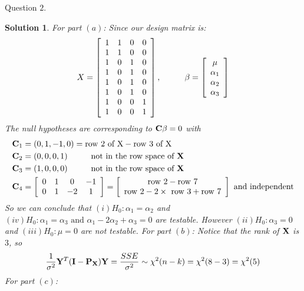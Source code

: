 \documentclass[11pt]{article}
\newtheorem{sol}{Solution}
\begin{document}
Question $2$.
\begin{sol}
	For part $(a)$:\vskip 2mm
	Since our design matrix is:
	\begin{align*}
			X = \left[\begin{array}{cccc}1&1&0&0\\ 1&1&0&0\\ 1&0&1&0\\ 1&0&1&0\\ 1&0&1&0\\ 1&0&1&0\\ 1&0&0&1\\1&0&0&1 \end{array}\right], \hskip 1cm \beta = \left[\begin{array}{c} \mu\\ \alpha_1 \\ \alpha_2\\ \alpha_3\end{array}\right]
	\end{align*}
	The null hypotheses are corresponding to ${\bf C}\beta = 0$ with
	\begin{align*}
		{\bf C}_1 &= (0, 1, -1, 0) = \text{row 2 of X} - \text{row 3 of X}\\
		{\bf C}_2 &= (0, 0, 0, 1) \hskip 1cm \text{not in the row space of }{\bf X}\\
		{\bf C}_3 &= (1, 0, 0, 0) \hskip 1cm \text{not in the row space of }{\bf X}\\
		{\bf C}_4 &= \left[\begin{array}{cccc} 0&1&0&-1\\ 0&1&-2&1\end{array}\right] = \left[\begin{array}{c}\text{row 2} - \text{row 7} \\ \text{row 2} - 2\times\text{ row 3} + \text{row 7}\end{array}\right] \text{ and independent}
	\end{align*}
	So we can conclude that $(i) H_0: \alpha_1 = \alpha_2$ and $(iv) H_0: \alpha_1 = \alpha_3 \text{ and } \alpha_1 - 2\alpha_2 + \alpha_3 = 0$ are testable. However $(ii) H_0: \alpha_3 = 0$ and $(iii) H_0: \mu = 0$ are not testable.\vskip 2mm
	For part $(b)$:\vskip 2mm
	Notice that the rank of ${\bf X}$ is $3$, so 
	\begin{align*}
		\frac{1}{\sigma^2}{\bf Y}^T({\bf I} - {\bf P}_{{\bf X}}){\bf Y} = \frac{SSE}{\sigma^2} \sim \chi^2(n - k) = \chi^2(8 - 3) = \chi^2(5)
	\end{align*}
	For part $(c)$:\vskip 2mm

\end{sol}
\end{document}
